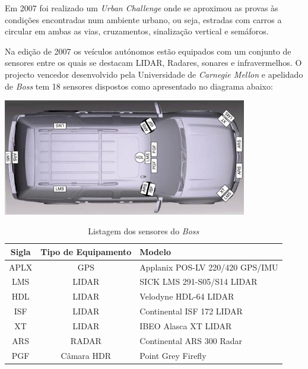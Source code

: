 Em 2007 foi realizado um \emph{Urban Challenge} onde se aproximou as provas às condições
encontradas num ambiente urbano, ou seja, estradas com carros a circular em ambas as
vias, cruzamentos, sinalização vertical  e semáforos.

Na edição de 2007 os veículos autónomos estão equipados com um conjunto de sensores
 entre os quais se destacam LIDAR, Radares, sonares e infravermelhos. O projecto
vencedor desenvolvido pela Universidade de \emph{Carnegie Mellon} e apelidado de
 \emph{Boss} \cite{Urmson:2008:ADU:1395073.1395077} tem
18 sensores dispostos como apresentado no diagrama abaixo:

\begin{center}
	\includegraphics[width=0.80\textwidth]{figures/boss_sensors.png}
	\label{fig:2}
\end{center}

\begin{table}
\begin{center}
\begin{tabular} { c c l }
	Sigla & Tipo de Equipamento & Modelo \\
	\hline
	APLX & GPS & Applanix POS-LV 220/420 GPS/IMU \\
	LMS & LIDAR & SICK LMS 291-S05/S14 LIDAR \\
	HDL & LIDAR & Velodyne HDL-64 LIDAR \\
	ISF & LIDAR & Continental ISF 172 LIDAR \\
	XT & LIDAR & IBEO Alasca XT LIDAR \\
	ARS & RADAR & Continental ARS 300 Radar \\
	PGF & Câmara HDR & Point Grey Firefly \\
	\hline
\end{tabular}
	\caption{Listagem dos sensores do \emph{Boss}}
	\label{boss_sensor}
\end{center}
\end{table}

